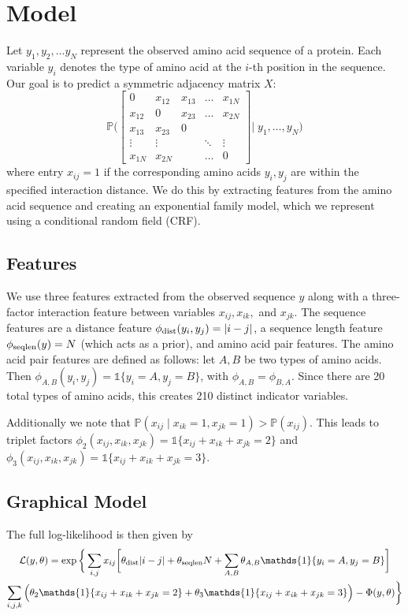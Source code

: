 \documentclass{article}
\begin{document}
\section{Model}
Let $y_1, y_2, \ldots y_N$ represent the observed amino acid sequence of a protein. Each variable $y_i$ denotes the type of amino acid at the $i$-th position in the sequence. Our goal is to predict a symmetric adjacency matrix $X$:
\begin{equation} \label{eq:adjmatrix}
\mathbb{P}\Bigg(
\begin{bmatrix} 
0         & x_{12} & x_{13} & \dots   & x_{1N} \\
x_{12} & 0         & x_{23} & \dots   & x_{2N} \\
x_{13} & x_{23} & 0         &            &             \\
\vdots & \vdots  &            & \ddots & \vdots   \\
x_{1N} & x_{2N} &          & \dots    & 0
\end{bmatrix}
\Bigg| \; y_1, \ldots, y_N\Bigg) 
\end{equation}
where entry $x_{ij} = 1$ if the corresponding amino acids $y_i, y_j$ are within the specified interaction distance. We do this by extracting features from the amino acid sequence and creating an exponential family model, which we represent using a conditional random field (CRF). 
\subsection{Features}
We use three features extracted from the observed sequence $y$ along with a three-factor interaction feature between variables $x_{ij}, x_{ik},$ and $x_{jk}$. The sequence features are a distance feature $\phi_{\textmd{dist}}(y_i, y_j) = |i - j|$, a sequence length feature $\phi_{\textmd{seqlen}}(y) = N$ (which acts as a prior), and amino acid pair features. The amino acid pair features are defined as follows: let $A, B$ be two types of amino acids. Then $\phi_{A, B}(y_i, y_j) = \mathds{1}\{y_i = A, y_j = B\}$, with $\phi_{A, B} = \phi_{B, A}$. Since there are 20 total types of amino acids, this creates 210 distinct indicator variables.

Additionally we note that $\mathbb{P}(x_{ij} \mid x_{ik} = 1, x_{jk} = 1) > \mathbb{P}(x_{ij})$. This leads to triplet factors $\phi_2(x_{ij}, x_{ik}, x_{jk}) = \mathds{1}\{x_{ij} + x_{ik} + x_{jk} = 2\}$ and $\phi_3(x_{ij}, x_{ik}, x_{jk}) = \mathds{1}\{x_{ij} + x_{ik} + x_{jk} = 3\}$. 
\subsection{Graphical Model}
The full log-likelihood is then given by
\begin{multline} \label{eq:likelihood}
\mathcal{L}(y, \theta) = \exp\bigg\{\sum_{i, j} x_{ij}\bigg[\theta_{\textmd{dist}}|i - j|+ \theta_{\textmd{seqlen}}N + \sum_{A, B} \theta_{A, B}\mathds{1}\{y_i = A, y_j = B\}\bigg] \\
\sum_{i, j, k}\Big(\theta_2\mathds{1}\{x_{ij} + x_{ik} + x_{jk} = 2\} + \theta_3\mathds{1}\{x_{ij} + x_{ik} + x_{jk} = 3\}\Big)  - \Phi(y, \theta) \bigg\}
\end{multline}
\end{document}

